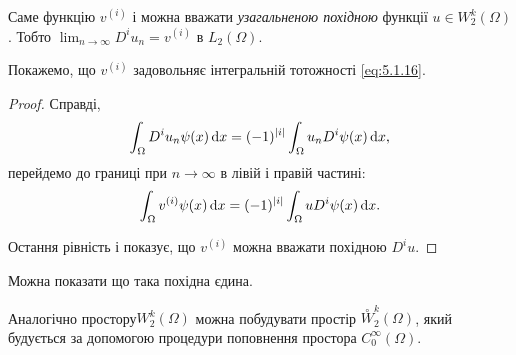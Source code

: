 \begin{definition}
    Саме функцію $v^{(i)}$ і можна вважати \emph{узагальненою похідною} функції $u \in W_2^k(\Omega)$. Тобто $\lim_{n \to \infty} D^i u_n = v^{(i)}$ в $L_2(\Omega)$. 
\end{definition}

\begin{proposition}
    Покажемо, що $v^{(i)}$ задовольняє інтегральній тотожності \eqref{eq:5.1.16}.
\end{proposition}

\begin{proof}
    Справді,
    \begin{equation*}
        \int_\Omega D^i u_n \psi(x) \mathop{}\!\mathrm{d} x = (-1)^{|i|} \int_\Omega u_n D^i \psi(x) \mathop{}\!\mathrm{d} x,
    \end{equation*}
    перейдемо до границі при $n \to \infty$ в лівій і правій частині:
    \begin{equation}
        \label{eq:5.1.17}
        \int_\Omega v^{(i)} \psi(x) \mathop{}\!\mathrm{d} x = (-1)^{|i|} \int_\Omega u D^i \psi(x) \mathop{}\!\mathrm{d} x.
    \end{equation}

    Остання рівність і показує, що $v^{(i)}$ можна вважати похідною $D^i u$. 
\end{proof}

\begin{remark}
    Можна показати що така похідна єдина.
\end{remark}

\begin{remark}
    Аналогічно простору$W_2^k(\Omega)$ можна побудувати простір $\overset{\circ}{W}_2^k(\Omega)$, який будується за допомогою процедури поповнення простора $C_0^\infty(\Omega)$.
\end{remark}
